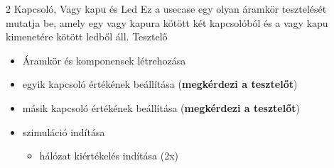 \usecase
{2 Kapcsoló, Vagy kapu és Led}
{Ez a usecase egy olyan áramkör tesztelését mutatja be, amely egy vagy kapura kötött két kapcsolóból és a vagy kapu kimenetére kötött ledből áll.}
{Tesztelő}
{\vspace{-15pt}
\begin{itemize}
\setlength{\itemsep}{0cm}%
\setlength{\parskip}{0cm}%
\item Áramkör és komponensek létrehozása
\item egyik kapcsoló értékének beállítása (\textbf{megkérdezi a tesztelőt})
\item másik kapcsoló értékének beállítása (\textbf{megkérdezi a tesztelőt})
\item szimuláció indítása
\begin{itemize}
\setlength{\itemsep}{0cm}%
\setlength{\parskip}{0cm}%
\item hálózat kiértékelés indítása (2x)
\begin{itemize}
\setlength{\itemsep}{0cm}%
\setlength{\parskip}{0cm}%

\end{itemize}
\end{itemize}
\end{itemize}}
